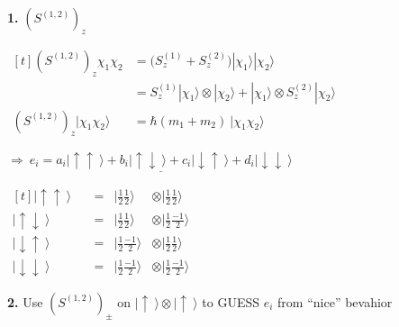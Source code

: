 \documentclass[12pt]{article}
\begin{document}
%
%
%
\newpage 
\noindent
\textbf{1.} \(\left( S^{(1,2)} \right)_z\) \\[10pt]
\begin{minipage}[t]{.55\textwidth}
    \( \begin{aligned}[t] 
        \left( S^{(1,2)} \right)_z \chi_1 \chi_2 
            &= \Big( S^{(1)}_z + S^{(2)}_z \Big) 
                | \chi_1 \rangle | \chi_2 \rangle\\[10pt]
        &= S^{(1)}_z | \chi_1 \rangle \otimes | \chi_2 \rangle 
            + | \chi_1 \rangle \otimes S^{(2)}_z | \chi_2 \rangle \\[10pt]
        \left( S^{(1,2)} \right)_z  | \chi_1 \chi_2 \rangle 
            &= \hbar (m_1 + m_2) \ | \chi_1 \chi_2 \rangle
    \end{aligned} \)
    
    \vspace{10pt}
    \( \Rightarrow \ \underline{ e_i = a_i| \uparrow \uparrow \ \rangle + b_i| \uparrow \downarrow \ \rangle +
    c_i| \downarrow \uparrow \ \rangle + d_i| \downarrow \downarrow \ \rangle } \)    
\end{minipage}
\hfill\vline\hfill
\begin{minipage}[t]{.3\textwidth}
    \( \begin{aligned}[t]
        | \uparrow \uparrow \ \rangle \quad & =
            & | \tfrac{1}{2} \tfrac{1}{2} \rangle 
            & \otimes | \tfrac{1}{2} \tfrac{1}{2} \rangle 
            \\[10pt]
        | \uparrow \downarrow \ \rangle \quad & =
            & | \tfrac{1}{2} \tfrac{1}{2} \rangle 
            & \otimes | \tfrac{1}{2} \tfrac{-1}{2} \rangle 
            \\[10pt]
        | \downarrow \uparrow \ \rangle \quad & =
            & | \tfrac{1}{2} \tfrac{-1}{2} \rangle 
            & \otimes | \tfrac{1}{2} \tfrac{1}{2} \rangle 
            \\[10pt]
        | \downarrow \downarrow \ \rangle \quad & =
            & | \tfrac{1}{2} \tfrac{-1}{2} \rangle 
            & \otimes | \tfrac{1}{2} \tfrac{-1}{2} \rangle
    \end{aligned}  \)
\end{minipage}

\vspace{25pt} \noindent
\textbf{2.} Use \( \left( S^{ (1,2) } \right)_\pm \) on 
    \( | \uparrow \ \rangle \otimes | \uparrow \ \rangle \) to GUESS \(e_i\) from ``nice'' bevahior 
\end{document}
